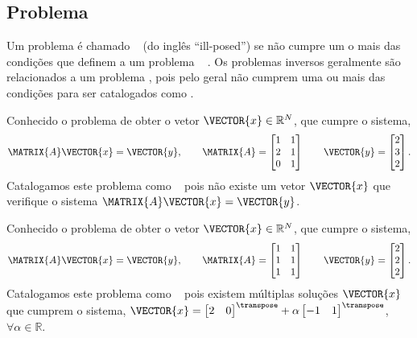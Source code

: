 \subsection{Problema \illposed}
\begin{definition}
\label{def:mal-posto:1}
Um problema é chamado \illposed~ (do inglês ``ill-posed'') se não cumpre um o mais das condições que definem a um problema 
\wellposed~ \cite[pp. 18]{gockenbach2016linear}.
Os problemas inversos geralmente são relacionados a um problema \illposed,
pois pelo geral não cumprem uma ou mais das condições para ser catalogados como \wellposed. 
\end{definition}

\begin{example}
\label{ex:IllPosedNoSolutions}
Conhecido o problema de obter o vetor $\VECTOR{x}\in \mathbb{R}^N$,
que cumpre o sistema,
\begin{equation}
\MATRIX{A}\VECTOR{x}=\VECTOR{y},
\qquad
\MATRIX{A}=
\begin{bmatrix}
1 & 1\\
2 & 1\\
0 & 1
\end{bmatrix}
\qquad
\VECTOR{y}=
\begin{bmatrix}
2\\
3\\
2
\end{bmatrix}.
\end{equation}
Catalogamos este problema como \illposed~ pois não existe um vetor $\VECTOR{x}$
que verifique o sistema $\MATRIX{A}\VECTOR{x}=\VECTOR{y}$.
\end{example}


\begin{example}
\label{ex:IllPosedMultiplaSolutions}
Conhecido o problema de obter o vetor $\VECTOR{x}\in \mathbb{R}^N$,
que cumpre o sistema,
\begin{equation}
\MATRIX{A}\VECTOR{x}=\VECTOR{y},
\qquad
\MATRIX{A}=
\begin{bmatrix}
1 & 1\\
1 & 1\\
1 & 1
\end{bmatrix}
\qquad
\VECTOR{y}=
\begin{bmatrix}
2\\
2\\
2
\end{bmatrix}.
\end{equation}
Catalogamos este problema como \illposed~  pois existem múltiplas soluções $\VECTOR{x}$
que cumprem o sistema,
$
\VECTOR{x}=
\begin{bmatrix}
2 & 0
\end{bmatrix}^{\transpose}
+\alpha
\begin{bmatrix}
-1 & 1
\end{bmatrix} ^{\transpose}$,
$ \forall \alpha \in \mathbb{R}$.
\end{example}

